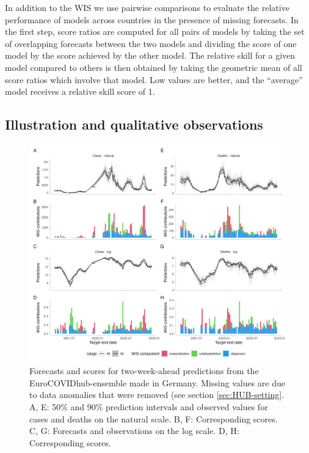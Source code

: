 \documentclass[10pt,letterpaper]{article}
\begin{document}
In addition to the WIS we use pairwise comparisons \cite{cramerEvaluationIndividualEnsemble2021} to evaluate the relative performance of models across countries in the presence of missing forecasts. In the first step, score ratios are computed for all pairs of models by taking the set of overlapping forecasts between the two models and dividing the score of one model by the score achieved by the other model. The relative skill for a given model compared to others is then obtained by taking the geometric mean of all score ratios which involve that model. Low values are better, and the ``average'' model receives a relative skill score of 1. 


\subsection*{Illustration and qualitative observations}

\begin{figure}[h!]
    \centering
    \includegraphics[width=0.99\textwidth]{../output/figures/HUB-model-comparison-ensemble.png}
    \caption{
    Forecasts and scores for two-week-ahead predictions from the EuroCOVIDhub-ensemble made in Germany. Missing values are due to data anomalies that were removed (see section \ref{sec:HUB-setting}. 
    A, E: 50\% and 90\% prediction intervals and observed values for cases and deaths on the natural scale. B, F: Corresponding scores. C, G: Forecasts and observations on the log scale. D, H: Corresponding scores. 
    }
    \label{fig:HUB-model-comparison-ensemble}
\end{figure}
\end{document}
